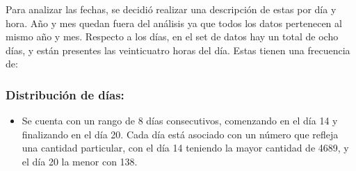 Para analizar las fechas, se decidió realizar una descripción de estas por día y hora. Año y mes quedan fuera del análisis ya que todos los datos pertenecen al mismo año y mes. Respecto a los días, en el set de datos hay un total de ocho días, y están presentes las veinticuatro horas del día. Estas tienen una frecuencia de:

\subsubsection{Distribución de días:}
\begin{itemize}
    \item Se cuenta con un rango de 8 días consecutivos, comenzando en el día 14 y finalizando en el día 20. Cada día está asociado con un número que refleja una cantidad particular, con el día 14 teniendo la mayor cantidad de 4689, y el día 20 la menor con 138.
\end{itemize}

